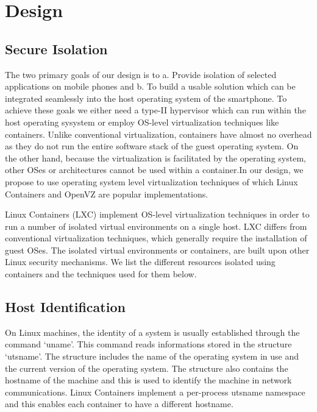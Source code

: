 \section{Design}
\label{sec:design}

\subsection{Secure Isolation}
The two primary goals of our design is to a. Provide isolation of selected applications on mobile phones and b. To build a usable solution which can be integrated seamlessly into the host operating system of the smartphone. To achieve these goals we either need a type-II hypervisor which can run within the host operating sysystem or employ OS-level virtualization techniques like containers.  Unlike conventional virtualization, containers have almost no overhead as they do not run the entire software stack of the guest operating system.  On the other hand, because the virtualization is facilitated by the operating system, other OSes or architectures cannot be used within a container.In our design, we propose to use operating system level virtualization techniques of which Linux Containers and OpenVZ are popular implementations.\\
 
Linux Containers (LXC) implement OS-level virtualization techniques in order to run a number of isolated virtual environments on a single host.  LXC differs from conventional virtualization techniques, which generally require the installation of guest OSes.  The isolated virtual environments or containers, are built upon other Linux security mechanisms. We list the different resources isolated using containers and the techniques used for them below.



\subsection{Host Identification}
On Linux machines, the identity of a system is usually established through the command `uname'. This command reads informations stored in the structure `utsname'. The structure includes the name of the operating system in use and the current version of the operating system. The structure also contains the hostname of the machine and this is used to identify the machine in network communications. Linux Containers implement a per-process utsname namespace and this enables each container to have a different hostname.

